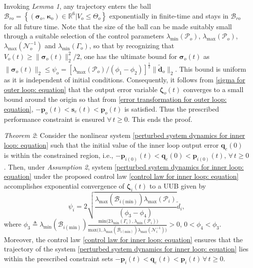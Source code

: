 \documentclass[lettersize,journal]{IEEEtran}
\begin{document}
Invoking \textit{Lemma 1}, any trajectory enters the ball $\mathcal{B}_{ro} = \left \{ \left ( \boldsymbol{\sigma}_o, \, \boldsymbol{\kappa}_o \right ) \in \mathbb{R}^6 | V_o \leq \Theta_o \right\}$ exponentially in finite-time and stays in $\mathcal{B}_{ro}$ for all future time. Note that the size of the ball can be made suitably small through a suitable selection of the control parameters $\lambda_{\text{min}}(\mathcal{P}_o)$, $\lambda_{\text{max}}(\mathcal{P}_o)$, $\lambda_{\text{max}}(\mathcal{N}_o^{-1}) $ and $\lambda_{\text{min}}(\Gamma_o)$, so that by recognizing that $V_o(t) \geq \lVert \boldsymbol{\sigma}_o(t) \rVert_2^2/2$, one has the ultimate bound for $\boldsymbol{\sigma}_o(t)$ as $\lVert \boldsymbol{\sigma}_o(t) \rVert_2 \leq \psi_o {=} \left[\lambda_{\text{max}}(\mathcal{P}_o)/\left(\phi_1 - \phi_2\right)\right]^{\frac{1}{2}} \lVert \tilde{\boldsymbol{d}}_{o} \rVert_2$. This bound is uniform as it is independent of initial conditions. 
Consequently, it follows from \eqref{sigma for outer loop: equation} that the output error variable $\boldsymbol{\zeta}_o(t)$ converges to a small bound around the origin so that from \eqref{error transformation for outer loop: equation}, $- \boldsymbol{p}_{o}(t) < \boldsymbol{s}_{e}(t) < \boldsymbol{p}_{o}(t)$ is satisfied. Thus the prescribed performance constraint is ensured $\forall \, t \geq 0$. This ends the proof.

\textit{Theorem 2}:
Consider the nonlinear system \eqref{perturbed system dynamics for inner loop: equation} such that the initial value of the inner loop output error $\boldsymbol{q}_e(0)$ is within the constrained region, i.e., $- \boldsymbol{p}_{i (0)}(t) < \boldsymbol{q}_{e}(0) < \boldsymbol{p}_{i (0)}(t), \, \forall \, t \geq 0$. Then, under \textit{Assumption 2}, system \eqref{perturbed system dynamics for inner loop: equation} under the proposed control law \eqref{control law for inner loop: equation} accomplishes exponential convergence of $\boldsymbol{\zeta}_i(t)$ to a UUB given by
\begin{equation}
    \psi_i = 2 \sqrt{\frac{\lambda_{\text{max}}(\mathcal{B}_{i(\text{min})})\lambda_{\text{max}}(\mathcal{P}_i)}{\left(\phi_3 - \phi_4\right)}} \tilde{d}_{i},
\end{equation}
where $\phi_3 \triangleq \lambda_{\text{min}}\left(\mathcal{B}_{i(\text{min})} \right) \frac{\text{ min}\big(2 \lambda_{\text{min}}\left(\Gamma_i \right),\lambda_{\text{min}}\left(\mathcal{P}_i \right)\big)}{\text{max}\big(1,\lambda_{\text{max}}\left(\mathcal{B}_{i(\text{min})} \right) \lambda_{\text{max}}\left(\mathcal{N}_i^{-1} \right)\big)}>0$, $0<\phi_4<\phi_3$.
Moreover, the control law \eqref{control law for inner loop: equation} ensures that the trajectory of the system \eqref{perturbed system dynamics for inner loop: equation} lies within the prescribed constraint sets $- \boldsymbol{p}_{i}(t) < \boldsymbol{q}_{e}(t) < \boldsymbol{p}_{i}(t) \, \forall \, t \geq 0$.
\end{document}
